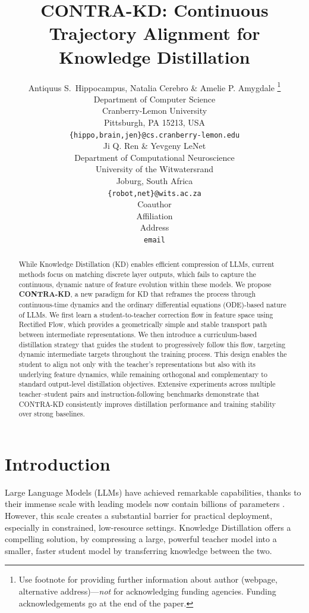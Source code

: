 \documentclass{article} %
\title{CONTRA-KD: Continuous Trajectory Alignment for Knowledge Distillation}
\author{Antiquus S.~Hippocampus, Natalia Cerebro \& Amelie P. Amygdale \thanks{ Use footnote for providing further information
about author (webpage, alternative address)---\emph{not} for acknowledging
funding agencies.  Funding acknowledgements go at the end of the paper.} \\
Department of Computer Science\\
Cranberry-Lemon University\\
Pittsburgh, PA 15213, USA \\
\texttt{\{hippo,brain,jen\}@cs.cranberry-lemon.edu} \\
\And
Ji Q. Ren \& Yevgeny LeNet \\
Department of Computational Neuroscience \\
University of the Witwatersrand \\
Joburg, South Africa \\
\texttt{\{robot,net\}@wits.ac.za} \\
\AND
Coauthor \\
Affiliation \\
Address \\
\texttt{email}
}
\theoremstyle{definition}
\theoremstyle{remark}
\begin{document}
\maketitle

\begin{abstract}
While Knowledge Distillation (KD) enables efficient compression of LLMs, current methods focus on matching discrete layer outputs, which fails to capture the continuous, dynamic nature of feature evolution within these models. We propose \textbf{CONTRA-KD}, a new paradigm for KD that reframes the process through continuous-time dynamics and the ordinary differential equations (ODE)-based nature of LLMs. We first learn a student-to-teacher correction flow in feature space using Rectified Flow, which provides a geometrically simple and stable transport path between intermediate representations. We then introduce a curriculum-based distillation strategy that guides the student to progressively follow this flow, targeting dynamic intermediate targets throughout the training process. This design enables the student to align not only with the teacher’s representations but also with its underlying feature dynamics, while remaining orthogonal and complementary to standard output-level distillation objectives. Extensive experiments across multiple teacher–student pairs and instruction-following benchmarks demonstrate that CONTRA-KD consistently improves distillation performance and training stability over strong baselines.
\end{abstract}

\section{Introduction}
Large Language Models (LLMs) have achieved remarkable capabilities, thanks to their immense scale with leading models now contain billions of parameters \cite{touvron2023llamaopenefficientfoundation}. However, this scale creates a substantial barrier for practical deployment, especially in constrained, low-resource settings. Knowledge Distillation \cite{hinton2015distillingknowledgeneuralnetwork} offers a compelling solution, by compressing a large, powerful teacher model into a smaller, faster student model by transferring knowledge between the two.
\end{document}
